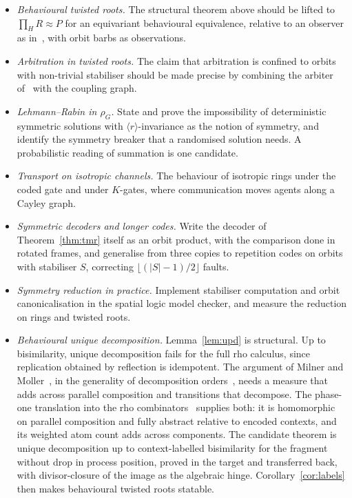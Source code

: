 \documentclass[11pt]{article}
\theoremstyle{definition}
\theoremstyle{remark}
\newcommand{\calc}{\rho_G}
\begin{document}
\begin{itemize}[leftmargin=1.5em]
\item \emph{Behavioural twisted roots.} The structural theorem above should be
  lifted to $\prod_H R\approx P$ for an equivariant behavioural equivalence,
  relative to an observer as in~\cite{rft}, with orbit barbs as observations.
\item \emph{Arbitration in twisted roots.} The claim that arbitration is
  confined to orbits with non-trivial stabiliser should be made precise by
  combining the arbiter of~\cite{rft} with the coupling graph.
\item \emph{Lehmann--Rabin in $\calc$.} State and prove the impossibility of
  deterministic symmetric solutions with $\langle r\rangle$-invariance as the
  notion of symmetry, and identify the symmetry breaker that a randomised
  solution needs. A probabilistic reading of summation is one candidate.
\item \emph{Transport on isotropic channels.} The behaviour of isotropic
  rings under the coded gate and under $K$-gates, where communication moves
  agents along a Cayley graph.
\item \emph{Symmetric decoders and longer codes.} Write the decoder of
  Theorem~\ref{thm:tmr} itself as an orbit product, with the comparison done
  in rotated frames, and generalise from three copies to repetition codes on
  orbits with stabiliser $S$, correcting $\lfloor(|S|-1)/2\rfloor$ faults.
\item \emph{Symmetry reduction in practice.} Implement stabiliser computation
  and orbit canonicalisation in the spatial logic model checker, and measure
  the reduction on rings and twisted roots.
\item \emph{Behavioural unique decomposition.} Lemma~\ref{lem:upd} is
  structural. Up to bisimilarity, unique decomposition fails for the full
  rho calculus, since replication obtained by reflection is idempotent. The
  argument of Milner and Moller~\cite{milner-moller}, in the generality of
  decomposition orders~\cite{luttik-vo}, needs a measure that adds across
  parallel composition and transitions that decompose. The phase-one
  translation into the rho combinators~\cite{rhocomb3} supplies both: it is
  homomorphic on parallel composition and fully abstract relative to encoded
  contexts, and its weighted atom count adds across components. The
  candidate theorem is unique decomposition up to context-labelled
  bisimilarity for the fragment without drop in process position, proved in
  the target and transferred back, with divisor-closure of the image as the
  algebraic hinge. Corollary~\ref{cor:labels} then makes behavioural twisted
  roots statable.
\end{itemize}
\end{document}
